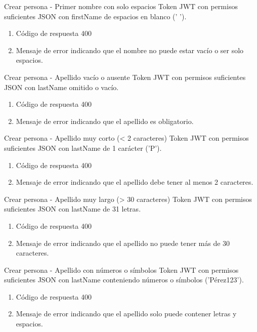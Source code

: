 {Crear persona - Primer nombre con solo espacios}
{Token JWT con permisos suficientes}
{JSON con firstName de espacios en blanco ('   ').}
{\begin{enumerate} [leftmargin=*, nosep]
    \item Código de respuesta 400
    \item Mensaje de error indicando que el nombre no puede estar vacío o ser solo espacios.
\end{enumerate}}

{Crear persona - Apellido vacío o ausente}
{Token JWT con permisos suficientes}
{JSON con lastName omitido o vacío.}
{\begin{enumerate} [leftmargin=*, nosep]
    \item Código de respuesta 400
    \item Mensaje de error indicando que el apellido es obligatorio.
\end{enumerate}}

{Crear persona - Apellido muy corto (< 2 caracteres)}
{Token JWT con permisos suficientes}
{JSON con lastName de 1 carácter ('P').}
{\begin{enumerate} [leftmargin=*, nosep]
    \item Código de respuesta 400
    \item Mensaje de error indicando que el apellido debe tener al menos 2 caracteres.
\end{enumerate}}

{Crear persona - Apellido muy largo (> 30 caracteres)}
{Token JWT con permisos suficientes}
{JSON con lastName de 31 letras.}
{\begin{enumerate} [leftmargin=*, nosep]
    \item Código de respuesta 400
    \item Mensaje de error indicando que el apellido no puede tener más de 30 caracteres.
\end{enumerate}}

{Crear persona - Apellido con números o símbolos}
{Token JWT con permisos suficientes}
{JSON con lastName conteniendo números o símbolos ('Pérez123').}
{\begin{enumerate} [leftmargin=*, nosep]
    \item Código de respuesta 400
    \item Mensaje de error indicando que el apellido solo puede contener letras y espacios.
\end{enumerate}}

